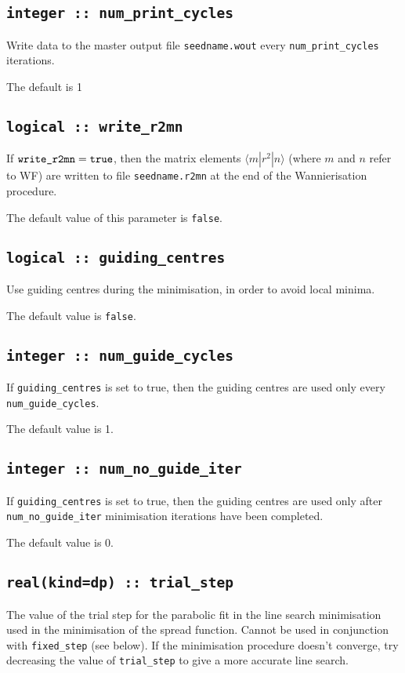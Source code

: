 \subsection[num\_print\_cycles]{\tt integer :: num\_print\_cycles}
Write data to the master output file {\tt seedname.wout} every
\verb#num_print_cycles# iterations.

The default is 1

\subsection[write\_r2mn]{\tt logical :: write\_r2mn}

If $\verb#write_r2mn#=\verb#true#$, then the matrix elements
$\langle m|r^2|n\rangle$ (where $m$ and $n$ refer to WF) are written
to file \verb#seedname.r2mn# at the end of the Wannierisation
procedure.

The default value of this parameter is \verb#false#.


\subsection[guiding\_centres]{\tt logical :: guiding\_centres}
Use guiding centres during the minimisation, in order to avoid
local minima.

The default value is \verb#false#.

\subsection[num\_guide\_cycles]{\tt integer :: num\_guide\_cycles}
If \verb#guiding_centres# is set to true, then the
guiding centres are used only every \verb#num_guide_cycles#.

The default value is 1.

\subsection[num\_no\_guide\_iter]{\tt integer :: num\_no\_guide\_iter}
If \verb#guiding_centres# is set to true, then the
guiding centres are used only after \verb#num_no_guide_iter#
minimisation iterations have been completed.

The default value is 0.

\subsection[trial\_step]{\tt real(kind=dp) :: trial\_step}
The value of the trial step for the parabolic fit in the line
search minimisation used in the minimisation of the spread
function. Cannot be used in conjunction with \verb#fixed_step# (see
below). If the minimisation procedure doesn't converge, try decreasing
the value of \verb#trial_step# to give a more accurate line search.

